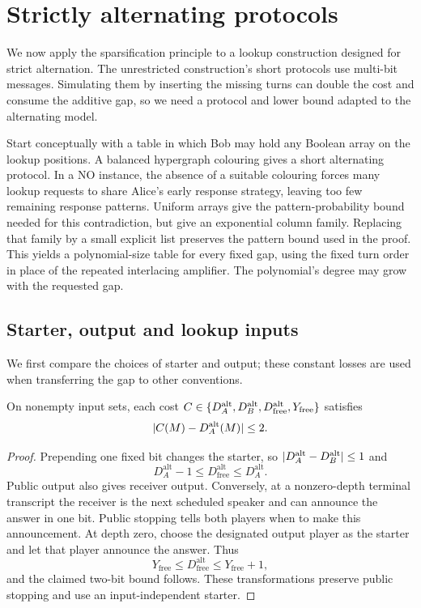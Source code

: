 \documentclass[11pt]{article} \usepackage[utf8]{inputenc}
\theoremstyle{plain} \newtheorem{theorem}{Theorem}[section]
\theoremstyle{definition} \newaliascnt{definition}{theorem}
\begin{document}

\section{Strictly alternating protocols}\label{sec:alternation}
\label{sec:alternating}

We now apply the sparsification principle to a lookup construction designed
for strict alternation. The unrestricted construction's short protocols use
multi-bit messages. Simulating them by inserting the missing turns can double
the cost and consume the additive gap, so we need a protocol and lower bound
adapted to the alternating model.

Start conceptually with a table in which Bob may hold any Boolean array on
the lookup positions. A balanced hypergraph colouring gives a short alternating
protocol. In a NO instance, the absence of a suitable colouring forces many
lookup requests to share Alice's early response strategy, leaving too few
remaining response patterns. Uniform arrays give the pattern-probability
bound needed for this contradiction, but give an exponential column
family. Replacing that family by a small explicit list preserves the pattern
bound used in the proof. This yields a polynomial-size table for every fixed
gap, using the fixed turn order in place of the repeated interlacing amplifier.
The polynomial's degree may grow with the requested gap.

\subsection{Starter, output and lookup inputs}

We first compare the choices of starter and output; these constant losses are
used when transferring the gap to other conventions.

\begin{lemma}\label{yao:comparison}
On nonempty input sets, each cost
$C\in\{D_A^{\rm alt},D_B^{\rm alt},D_{\rm free}^{\rm alt},Y_{\rm free}\}$
satisfies
\[
|C(M)-D_A^{\rm alt}(M)|\le2.
\]
\end{lemma}
\begin{proof}
Prepending one fixed bit changes the starter, so
$|D_A^{\rm alt}-D_B^{\rm alt}|\le1$ and
\[
D_A^{\mathrm{alt}}-1\le D_{\mathrm{free}}^{\mathrm{alt}}\le D_A^{\mathrm{alt}}.
\]
Public output also gives receiver output. Conversely, at a nonzero-depth
terminal transcript the receiver is the next scheduled speaker and can announce
the answer in one bit. Public stopping tells both players when to make this
announcement. At depth zero, choose the designated output player as the starter
and let that player announce the answer. Thus
\[
Y_{\mathrm{free}}\le D_{\mathrm{free}}^{\mathrm{alt}}\le Y_{\mathrm{free}}+1,
\]
and the claimed two-bit bound follows. These transformations preserve public
stopping and use an input-independent starter.
\end{proof}
\end{document}
